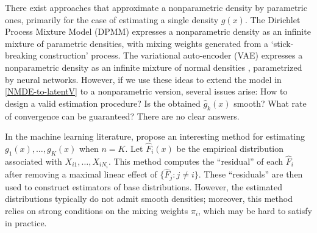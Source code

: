 \documentclass[preprint,11pt]{article}
\def\r#1{\textcolor{red}{\bf #1}}
\numberwithin{equation}{section}
\begin{document}
There exist approaches that approximate a nonparametric density by parametric ones, primarily for the case of estimating a single density $g(x)$. The Dirichlet Process Mixture Model (DPMM) \citep{escobar1995bayesian}  expresses a nonparametric density as an infinite mixture of parametric densities, with mixing weights generated from a `stick-breaking construction' process. 
The variational auto-encoder (VAE) expresses a nonparametric density as an infinite mixture of normal densities \citep{demange2023variational}, parametrized by neural networks. 
However, if we use these ideas to extend the model in \eqref{NMDE-to-latentV} to a nonparametric version, several issues arise: How to design a valid estimation procedure? 
Is the obtained $\hat{g}_k(x)$ smooth? What rate of convergence can be guaranteed? There are no clear answers.   

In the machine learning literature, \cite{katz2019decontamination} propose an interesting method for estimating $g_1(x), \ldots, g_K(x)$ when $n=K$. Let $\hat{F}_i(x)$ be the empirical distribution associated with $X_{i1}, \ldots, X_{iN_i}$. This method computes the ``residual'' of each $\hat{F}_i$ after removing a maximal linear effect of $\{\hat{F}_j: j\neq i\}$. These ``residuals'' are then used to construct estimators of base distributions. However, the estimated distributions typically do not admit smooth densities; moreover, this method  relies on strong conditions on the mixing weights $\pi_i$, which may be hard to satisfy in practice. %
\end{document}
